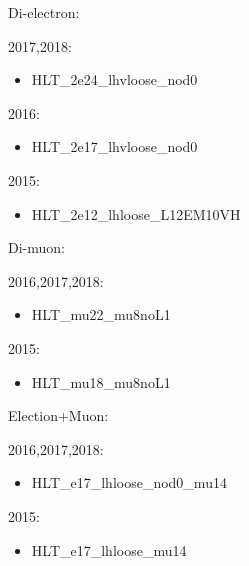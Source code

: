 Di-electron:

2017,2018:
\begin{itemize}
	\item HLT\_2e24\_lhvloose\_nod0
\end{itemize}
2016:
\begin{itemize}
	\item HLT\_2e17\_lhvloose\_nod0
\end{itemize}
2015:
\begin{itemize}
	\item HLT\_2e12\_lhloose\_L12EM10VH
\end{itemize}

Di-muon:

2016,2017,2018:
\begin{itemize}
	\item HLT\_mu22\_mu8noL1
\end{itemize}
2015:
\begin{itemize}
	\item HLT\_mu18\_mu8noL1
\end{itemize}

Election+Muon:

2016,2017,2018:
\begin{itemize}
	\item HLT\_e17\_lhloose\_nod0\_mu14
\end{itemize}
2015:
\begin{itemize}
	\item HLT\_e17\_lhloose\_mu14
\end{itemize}
%  
%  
%  
%  

